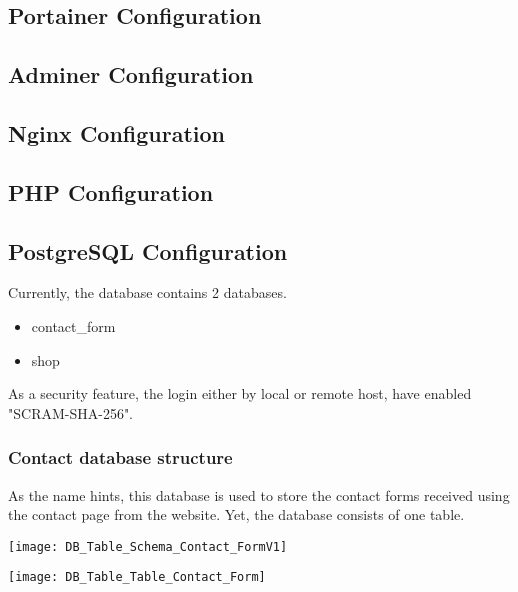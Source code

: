 \subsection{Portainer Configuration}\label{subsec:portainer-configuration}
\subsection{Adminer Configuration}\label{subsec:adminer-configuration}
\subsection{Nginx Configuration}\label{subsec:nginx-configuration}
\subsection{PHP Configuration}\label{subsec:php-configuration}

\subsection{PostgreSQL Configuration}\label{subsec:postgresql-configuration}
\begin{flushleft}
    Currently, the database contains 2 databases.
    \begin{itemize}
        \item contact\_form
        \item shop
    \end{itemize}
    As a security feature, the login either by local or remote host, have enabled "SCRAM-SHA-256".
\end{flushleft}
\subsubsection[Contact database structure]{Contact database structure}
\begin{flushleft}
    As the name hints, this database is used to store the contact forms received using the contact page from the website.
    Yet, the database consists of one table.
\end{flushleft}

\begin{center}
    \texttt{[image: DB\_Table\_Schema\_Contact\_FormV1]}
\end{center}
\begin{center}
    \texttt{[image: DB\_Table\_Table\_Contact\_Form]}
\end{center}

